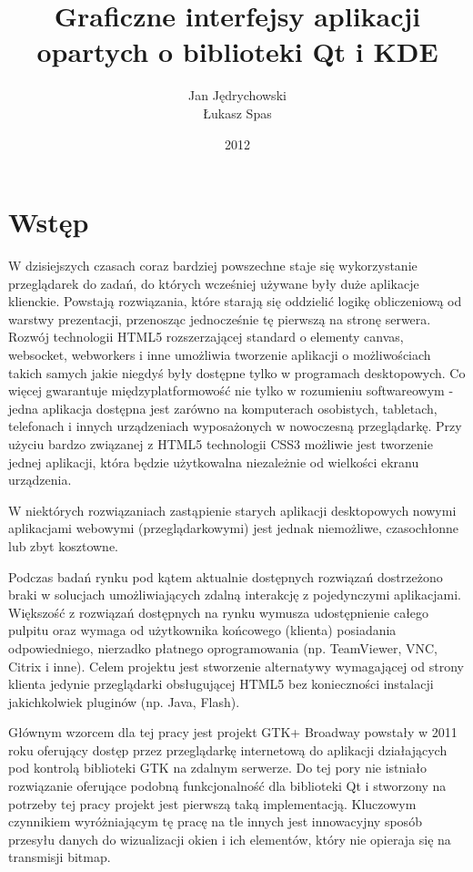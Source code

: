 \documentclass[polish]{inz}
\title{Graficzne interfejsy aplikacji opartych o biblioteki Qt i KDE}
\author{Jan Jędrychowski\\Łukasz Spas}
\date{2012}
\begin{document}
\maketitle

\chapter{Wstęp}

W dzisiejszych czasach coraz bardziej powszechne staje się wykorzystanie przeglądarek do zadań, do których wcześniej używane były duże aplikacje klienckie. Powstają rozwiązania, które starają się oddzielić logikę obliczeniową od warstwy prezentacji, przenosząc jednocześnie tę pierwszą na stronę serwera. Rozwój technologii HTML5 rozszerzającej standard o elementy canvas, websocket, webworkers i inne umożliwia tworzenie aplikacji o możliwościach takich samych jakie niegdyś były dostępne tylko w programach desktopowych. Co więcej gwarantuje międzyplatformowość nie tylko w rozumieniu softwareowym - jedna aplikacja dostępna jest zarówno na komputerach osobistych, tabletach, telefonach i innych urządzeniach wyposażonych w nowoczesną przeglądarkę. Przy użyciu bardzo związanej z HTML5 technologii CSS3 możliwie jest tworzenie jednej aplikacji, która będzie użytkowalna niezależnie od wielkości ekranu urządzenia.

W niektórych rozwiązaniach zastąpienie starych aplikacji desktopowych nowymi aplikacjami webowymi (przeglądarkowymi) jest jednak niemożliwe, czasochłonne lub zbyt kosztowne.

Podczas badań rynku pod kątem aktualnie dostępnych rozwiązań dostrzeżono braki w solucjach umożliwiających zdalną interakcję z pojedynczymi aplikacjami. Większość z rozwiązań dostępnych na rynku wymusza udostępnienie całego pulpitu oraz wymaga od użytkownika końcowego (klienta) posiadania odpowiedniego, nierzadko płatnego oprogramowania (np. TeamViewer, VNC, Citrix i inne). Celem projektu jest stworzenie alternatywy wymagającej od strony klienta jedynie przeglądarki obsługującej HTML5 bez konieczności instalacji jakichkolwiek pluginów (np. Java, Flash).

Głównym wzorcem dla tej pracy jest projekt GTK+ Broadway powstały w 2011 roku oferujący dostęp przez przeglądarkę internetową do aplikacji działających pod kontrolą biblioteki GTK na zdalnym serwerze. Do tej pory nie istniało rozwiązanie oferujące podobną funkcjonalność dla biblioteki Qt i stworzony na potrzeby tej pracy projekt jest pierwszą taką implementacją. Kluczowym czynnikiem wyróżniającym tę pracę na tle innych jest innowacyjny sposób przesyłu danych do wizualizacji okien i ich elementów, który nie opieraja się na transmisji bitmap.
\end{document}
